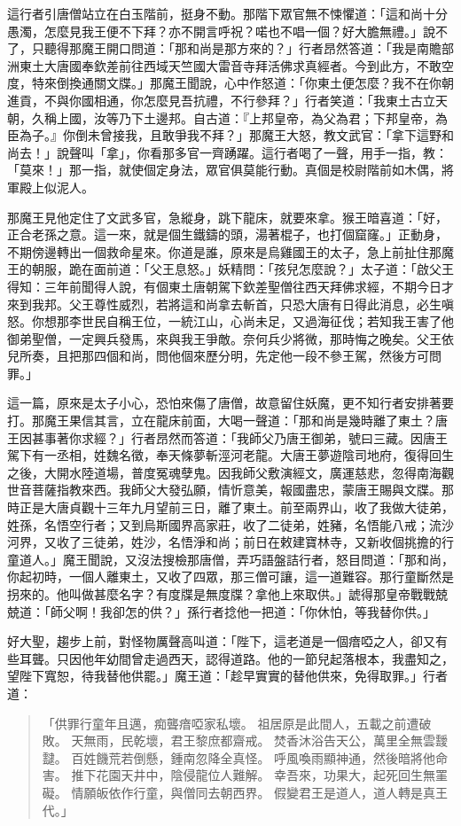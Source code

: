 這行者引唐僧站立在白玉階前，挺身不動。那階下眾官無不悚懼道：「這和尚十分愚濁，怎麼見我王便不下拜？亦不開言呼祝？喏也不唱一個？好大膽無禮。」說不了，只聽得那魔王開口問道：「那和尚是那方來的？」行者昂然答道：「我是南贍部洲東土大唐國奉欽差前往西域天竺國大雷音寺拜活佛求真經者。今到此方，不敢空度，特來倒換通關文牒。」那魔王聞說，心中作怒道：「你東土便怎麼？我不在你朝進貢，不與你國相通，你怎麼見吾抗禮，不行參拜？」行者笑道：「我東土古立天朝，久稱上國，汝等乃下土邊邦。自古道：『上邦皇帝，為父為君；下邦皇帝，為臣為子。』你倒未曾接我，且敢爭我不拜？」那魔王大怒，教文武官：「拿下這野和尚去！」說聲叫「拿」，你看那多官一齊踴躍。這行者喝了一聲，用手一指，教：「莫來！」那一指，就使個定身法，眾官俱莫能行動。真個是校尉階前如木偶，將軍殿上似泥人。

那魔王見他定住了文武多官，急縱身，跳下龍床，就要來拿。猴王暗喜道：「好，正合老孫之意。這一來，就是個生鐵鑄的頭，湯著棍子，也打個窟窿。」正動身，不期傍邊轉出一個救命星來。你道是誰，原來是烏雞國王的太子，急上前扯住那魔王的朝服，跪在面前道：「父王息怒。」妖精問：「孩兒怎麼說？」太子道：「啟父王得知：三年前聞得人說，有個東土唐朝駕下欽差聖僧往西天拜佛求經，不期今日才來到我邦。父王尊性威烈，若將這和尚拿去斬首，只恐大唐有日得此消息，必生嗔怒。你想那李世民自稱王位，一統江山，心尚未足，又過海征伐；若知我王害了他御弟聖僧，一定興兵發馬，來與我王爭敵。奈何兵少將微，那時悔之晚矣。父王依兒所奏，且把那四個和尚，問他個來歷分明，先定他一段不參王駕，然後方可問罪。」

這一篇，原來是太子小心，恐怕來傷了唐僧，故意留住妖魔，更不知行者安排著要打。那魔王果信其言，立在龍床前面，大喝一聲道：「那和尚是幾時離了東土？唐王因甚事著你求經？」行者昂然而答道：「我師父乃唐王御弟，號曰三藏。因唐王駕下有一丞相，姓魏名徵，奉天條夢斬涇河老龍。大唐王夢遊陰司地府，復得回生之後，大開水陸道場，普度冤魂孽鬼。因我師父敷演經文，廣運慈悲，忽得南海觀世音菩薩指教來西。我師父大發弘願，情忻意美，報國盡忠，蒙唐王賜與文牒。那時正是大唐貞觀十三年九月望前三日，離了東土。前至兩界山，收了我做大徒弟，姓孫，名悟空行者；又到烏斯國界高家莊，收了二徒弟，姓豬，名悟能八戒；流沙河界，又收了三徒弟，姓沙，名悟淨和尚；前日在敕建寶林寺，又新收個挑擔的行童道人。」魔王聞說，又沒法搜檢那唐僧，弄巧語盤詰行者，怒目問道：「那和尚，你起初時，一個人離東土，又收了四眾，那三僧可讓，這一道難容。那行童斷然是拐來的。他叫做甚麼名字？有度牒是無度牒？拿他上來取供。」諕得那皇帝戰戰兢兢道：「師父啊！我卻怎的供？」孫行者捻他一把道：「你休怕，等我替你供。」

好大聖，趨步上前，對怪物厲聲高叫道：「陛下，這老道是一個瘖啞之人，卻又有些耳聾。只因他年幼間曾走過西天，認得道路。他的一節兒起落根本，我盡知之，望陛下寬恕，待我替他供罷。」魔王道：「趁早實實的替他供來，免得取罪。」行者道：
\begin{quote}
「供罪行童年且邁，痴聾瘖啞家私壞。
祖居原是此間人，五載之前遭破敗。
天無雨，民乾壞，君王黎庶都齋戒。
焚香沐浴告天公，萬里全無雲靉靆。
百姓饑荒若倒懸，鍾南忽降全真怪。
呼風喚雨顯神通，然後暗將他命害。
推下花園天井中，陰侵龍位人難解。
幸吾來，功果大，起死回生無罣礙。
情願皈依作行童，與僧同去朝西界。
假變君王是道人，道人轉是真王代。」
\end{quote}

